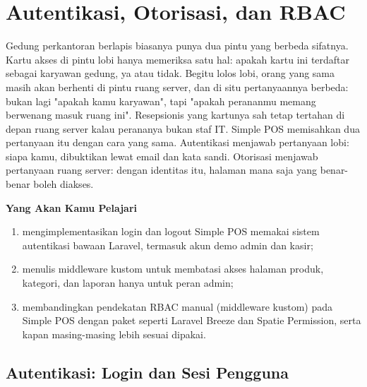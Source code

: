 
\chapter{Autentikasi, Otorisasi, dan RBAC}
\label{ch:autentikasi-dan-otorisasi}


Gedung perkantoran berlapis biasanya punya dua pintu yang berbeda
sifatnya. Kartu akses di pintu lobi hanya memeriksa satu hal: apakah
kartu ini terdaftar sebagai karyawan gedung, ya atau tidak. Begitu lolos
lobi, orang yang sama masih akan berhenti di pintu ruang server, dan di
situ pertanyaannya berbeda: bukan lagi "apakah kamu karyawan", tapi
"apakah perananmu memang berwenang masuk ruang ini". Resepsionis yang
kartunya sah tetap tertahan di depan ruang server kalau perananya bukan
staf IT. Simple POS memisahkan dua pertanyaan itu dengan cara yang
sama. Autentikasi menjawab pertanyaan lobi: siapa kamu, dibuktikan lewat
email dan kata sandi. Otorisasi menjawab pertanyaan ruang server: dengan
identitas itu, halaman mana saja yang benar-benar boleh diakses.

\textbf{Yang Akan Kamu Pelajari}

\begin{enumerate}
  \item mengimplementasikan login dan logout Simple POS memakai sistem autentikasi bawaan Laravel, termasuk akun demo admin dan kasir;
  \item menulis middleware  kustom untuk membatasi akses halaman produk, kategori, dan laporan hanya untuk peran admin;
  \item membandingkan pendekatan RBAC manual (middleware kustom) pada Simple POS dengan paket seperti Laravel Breeze dan Spatie Permission, serta kapan masing-masing lebih sesuai dipakai.
\end{enumerate}

\section{Autentikasi: Login dan Sesi Pengguna}
\label{sec:autentikasi-dan-otorisasi-1}

